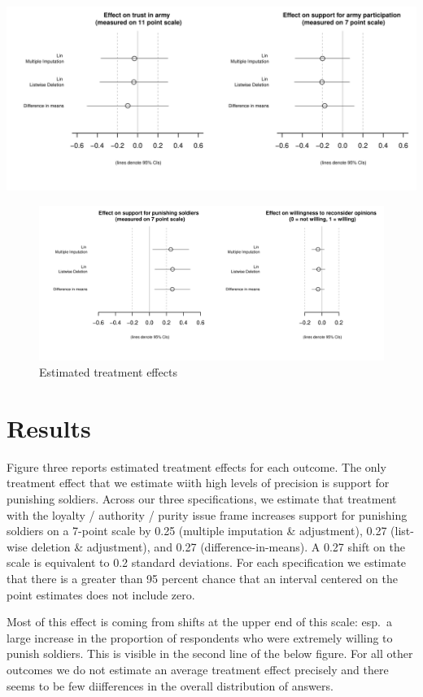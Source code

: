 \documentclass[
  12pt,
]{article}
\begin{document}
\includegraphics{marko-oliver_final-proj_files/figure-latex/unnamed-chunk-6-1.pdf}

\begin{figure}
\centering
\includegraphics{marko-oliver_final-proj_files/figure-latex/unnamed-chunk-7-1.pdf}
\caption{Estimated treatment effects}
\end{figure}

\hypertarget{results}{%
\section{Results}\label{results}}

Figure three reports estimated treatment effects for each outcome. The
only treatment effect that we estimate wiith high levels of precision is
support for punishing soldiers. Across our three specifications, we
estimate that treatment with the loyalty / authority / purity issue
frame increases support for punishing soldiers on a 7-point scale by
0.25 (multiple imputation \& adjustment), 0.27 (list-wise deletion \&
adjustment), and 0.27 (difference-in-means). A 0.27 shift on the scale
is equivalent to 0.2 standard deviations. For each specification we
estimate that there is a greater than 95 percent chance that an interval
centered on the point estimates does not include zero.

Most of this effect is coming from shifts at the upper end of this
scale: esp.~a large increase in the proportion of respondents who were
extremely willing to punish soldiers. This is visible in the second line
of the below figure. For all other outcomes we do not estimate an
average treatment effect precisely and there seems to be few
diifferences in the overall distribution of answers.
\end{document}
